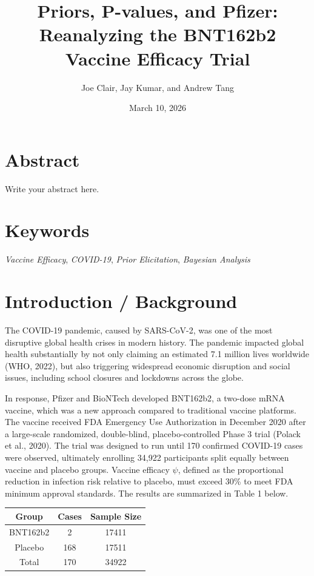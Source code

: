 \documentclass[
  11pt,
]{article}
\title{Priors, P-values, and Pfizer: Reanalyzing the BNT162b2 Vaccine
Efficacy Trial}
\author{Joe Clair, Jay Kumar, and Andrew Tang}
\date{March 10, 2026}
\begin{document}
\maketitle

\section{Abstract}\label{abstract}

Write your abstract here.

\section{Keywords}\label{keywords}

\emph{Vaccine Efficacy}, \emph{COVID-19}, \emph{Prior Elicitation},
\emph{Bayesian Analysis}

\newpage

\section{Introduction / Background}\label{introduction-background}

The COVID-19 pandemic, caused by SARS-CoV-2, was one of the most
disruptive global health crises in modern history. The pandemic impacted
global health substantially by not only claiming an estimated 7.1
million lives worldwide (WHO, 2022), but also triggering widespread
economic disruption and social issues, including school closures and
lockdowns across the globe.

In response, Pfizer and BioNTech developed BNT162b2, a two-dose mRNA
vaccine, which was a new approach compared to traditional vaccine
platforms. The vaccine received FDA Emergency Use Authorization in
December 2020 after a large-scale randomized, double-blind,
placebo-controlled Phase 3 trial (Polack et al., 2020). The trial was
designed to run until 170 confirmed COVID-19 cases were observed,
ultimately enrolling 34,922 participants split equally between vaccine
and placebo groups. Vaccine efficacy \(\psi\), defined as the
proportional reduction in infection risk relative to placebo, must
exceed 30\% to meet FDA minimum approval standards. The results are
summarized in Table 1 below.

\begin{center}
    \begin{tabular}{|c|c|c|}
        \hline
        Group & Cases & Sample Size \\
        \hline
        BNT162b2 & 2 & 17411 \\
        \hline
        Placebo & 168 & 17511 \\
        \hline
        Total & 170 & 34922 \\
        \hline
    \end{tabular}
\end{center}
\end{document}
